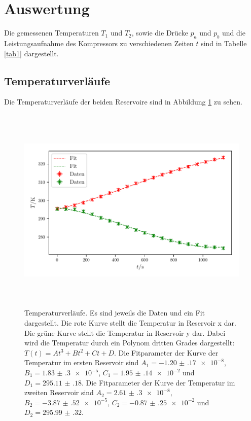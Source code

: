 \section{Auswertung}
\label{sec:Auswertung}

Die gemessenen Temperaturen $T_1$ und $T_2$, sowie die Drücke
$p_a$ und $p_b$ und die Leistungsaufnahme des Kompressors
zu verschiedenen Zeiten $t$ sind in Tabelle \ref{tab1}
dargestellt.


\subsection{Temperaturverläufe}
Die Temperaturverläufe der beiden Reservoire sind in Abbildung
\ref{fig:plot1} zu sehen.

\begin{figure} %
    \centering
    \includegraphics[width=14cm, height=10cm]{build/plot1.pdf}
    \caption{Temperaturverläufe. Es sind jeweils die Daten und ein Fit dargestellt.
    Die rote Kurve stellt die Temperatur in Reservoir x dar. Die grüne Kurve stellt 
    die Temperatur in Reservoir y dar. Dabei wird die Temperatur
    durch ein Polynom dritten Grades dargestellt: $T(t) = At^3+Bt^2+Ct+D$. 
    Die Fitparameter der Kurve der Temperatur im ersten Reservoir sind $A_1=\num{-1.20(17)e-8}$,
    $B_1=\num{1.83(30)e-5}$, $C_1=\num{1.95(14)e-2}$ und $D_1=\SI{295.11(18)}$.
    Die Fitparameter der Kurve der Temperatur im zweiten Reservoir sind $A_2=\num{2.61(30)e-8}$,
    $B_2=\num{-3.87(52)e-5}$, $C_2=\num{-0.87(25)e-2}$ und $D_2=\num{295.99(32)}$.
    }
    \label{fig:plot1}
\end{figure}


